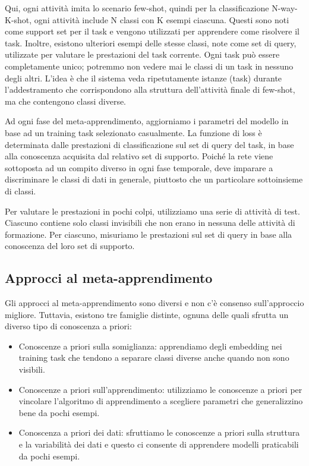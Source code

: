 \documentclass[12pt,a4paper,titlepage]{article}
\begin{document}
Qui, ogni attività imita lo scenario few-shot, quindi per la classificazione N-way-K-shot, ogni attività include N classi con K esempi ciascuna. Questi sono noti come support set per il task e vengono utilizzati per apprendere come risolvere il task. Inoltre, esistono ulteriori esempi delle stesse classi, note come set di query, utilizzate per valutare le prestazioni del task corrente. Ogni task può essere completamente unico; potremmo non vedere mai le classi di un task in nessuno degli altri. L'idea è che il sistema veda ripetutamente istanze (task) durante l'addestramento che corrispondono alla struttura dell'attività finale di few-shot, ma che contengono classi diverse.

Ad ogni fase del meta-apprendimento, aggiorniamo i parametri del modello in base ad un training task selezionato casualmente. La funzione di loss è determinata dalle prestazioni di classificazione sul set di query del task, in base alla conoscenza acquisita dal relativo set di supporto. Poiché la rete viene sottoposta ad un compito diverso in ogni fase temporale, deve imparare a discriminare le classi di dati in generale, piuttosto che un particolare sottoinsieme di classi.

Per valutare le prestazioni in pochi colpi, utilizziamo una serie di attività di test. Ciascuno contiene solo classi invisibili che non erano in nessuna delle attività di formazione. Per ciascuno, misuriamo le prestazioni sul set di query in base alla conoscenza del loro set di supporto.

\subsection{Approcci al meta-apprendimento}
Gli approcci al meta-apprendimento sono diversi e non c'è consenso sull'approccio migliore. Tuttavia, esistono tre famiglie distinte, ognuna delle quali sfrutta un diverso tipo di conoscenza a priori:
\begin{itemize}
	\item Conoscenze a priori sulla somiglianza: apprendiamo degli embedding nei training task che tendono a separare classi diverse anche quando non sono visibili.
	\item Conoscenze a priori sull'apprendimento: utilizziamo le conoscenze a priori per vincolare l'algoritmo di apprendimento a scegliere parametri che generalizzino bene da pochi esempi.
	\item Conoscenza a priori dei dati: sfruttiamo le conoscenze a priori sulla struttura e la variabilità dei dati e questo ci consente di apprendere modelli praticabili da pochi esempi.
\end{itemize}
\end{document}
